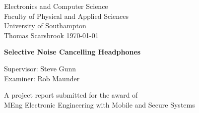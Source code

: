 \begin{titlepage}
\thispagestyle{plain}
\begin{center}

\LARGE{Electronics and Computer Science}\\
\LARGE{Faculty of Physical and Applied Sciences}\\
\LARGE{University of Southampton}\\
\vfill
\normalsize{Thomas Scarsbrook}
\vfill
\normalsize\today

\vfill

\Large{\textbf{Selective Noise Cancelling Headphones}}

\vfill

\normalsize{Supervisor: Steve Gunn}\\
\normalsize{Examiner: Rob Maunder}

\vfill

\large{A project report submitted for the award of\\
MEng Electronic Engineering with Mobile and Secure Systems}

\end{center}
\end{titlepage}
